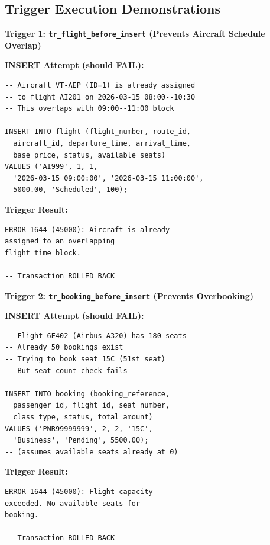 \documentclass[12pt, a4paper]{article}
\begin{document}
\subsection{Trigger Execution Demonstrations}

\textbf{Trigger 1: \texttt{tr\_flight\_before\_insert} (Prevents Aircraft Schedule Overlap)}

\noindent\begin{minipage}[t]{0.48\textwidth}
\textbf{INSERT Attempt (should FAIL):}
\begin{lstlisting}[style=sqlstyle,basicstyle=\tiny\ttfamily,showstringspaces=false]
-- Aircraft VT-AEP (ID=1) is already assigned 
-- to flight AI201 on 2026-03-15 08:00--10:30
-- This overlaps with 09:00--11:00 block

INSERT INTO flight (flight_number, route_id, 
  aircraft_id, departure_time, arrival_time, 
  base_price, status, available_seats)
VALUES ('AI999', 1, 1, 
  '2026-03-15 09:00:00', '2026-03-15 11:00:00',
  5000.00, 'Scheduled', 100);
\end{lstlisting}
\end{minipage}\hfill
\begin{minipage}[t]{0.48\textwidth}
\textbf{Trigger Result:}
\begin{lstlisting}[style=sqlstyle,basicstyle=\tiny\ttfamily,showstringspaces=false]
ERROR 1644 (45000): Aircraft is already 
assigned to an overlapping 
flight time block.

-- Transaction ROLLED BACK
\end{lstlisting}
\end{minipage}

\vspace{0.3cm}

\textbf{Trigger 2: \texttt{tr\_booking\_before\_insert} (Prevents Overbooking)}

\noindent\begin{minipage}[t]{0.48\textwidth}
\textbf{INSERT Attempt (should FAIL):}
\begin{lstlisting}[style=sqlstyle,basicstyle=\tiny\ttfamily,showstringspaces=false]
-- Flight 6E402 (Airbus A320) has 180 seats
-- Already 50 bookings exist
-- Trying to book seat 15C (51st seat)
-- But seat count check fails

INSERT INTO booking (booking_reference, 
  passenger_id, flight_id, seat_number, 
  class_type, status, total_amount)
VALUES ('PNR99999999', 2, 2, '15C', 
  'Business', 'Pending', 5500.00);
-- (assumes available_seats already at 0)
\end{lstlisting}
\end{minipage}\hfill
\begin{minipage}[t]{0.48\textwidth}
\textbf{Trigger Result:}
\begin{lstlisting}[style=sqlstyle,basicstyle=\tiny\ttfamily,showstringspaces=false]
ERROR 1644 (45000): Flight capacity 
exceeded. No available seats for 
booking.

-- Transaction ROLLED BACK
\end{lstlisting}
\end{minipage}
\end{document}
